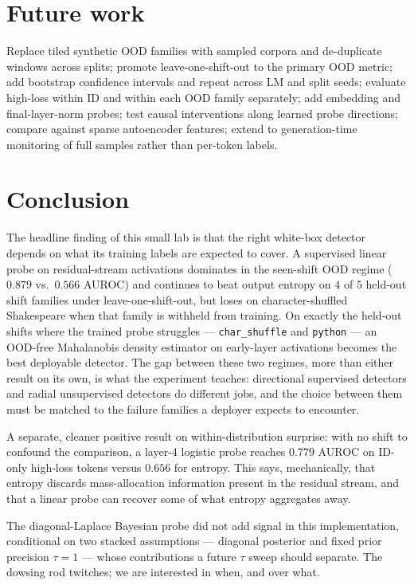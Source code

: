 \documentclass[11pt]{article}
\begin{document}
\section{Future work}

Replace tiled synthetic OOD families with sampled corpora and de-duplicate windows across splits; promote leave-one-shift-out to the primary OOD metric; add bootstrap confidence intervals and repeat across LM and split seeds; evaluate high-loss within ID and within each OOD family separately; add embedding and final-layer-norm probes; test causal interventions along learned probe directions; compare against sparse autoencoder features; extend to generation-time monitoring of full samples rather than per-token labels.

\section{Conclusion}

The headline finding of this small lab is that the right white-box detector depends on what its training labels are expected to cover. A supervised linear probe on residual-stream activations dominates in the seen-shift OOD regime ($0.879$ vs.\ $0.566$ AUROC) and continues to beat output entropy on $4$ of $5$ held-out shift families under leave-one-shift-out, but loses on character-shuffled Shakespeare when that family is withheld from training. On exactly the held-out shifts where the trained probe struggles --- \texttt{char\_shuffle} and \texttt{python} --- an OOD-free Mahalanobis density estimator on early-layer activations becomes the best deployable detector. The gap between these two regimes, more than either result on its own, is what the experiment teaches: directional supervised detectors and radial unsupervised detectors do different jobs, and the choice between them must be matched to the failure families a deployer expects to encounter.

A separate, cleaner positive result on within-distribution surprise: with no shift to confound the comparison, a layer-4 logistic probe reaches $0.779$ AUROC on ID-only high-loss tokens versus $0.656$ for entropy. This says, mechanically, that entropy discards mass-allocation information present in the residual stream, and that a linear probe can recover some of what entropy aggregates away.

The diagonal-Laplace Bayesian probe did not add signal in this implementation, conditional on two stacked assumptions --- diagonal posterior and fixed prior precision $\tau=1$ --- whose contributions a future $\tau$ sweep should separate. The dowsing rod twitches; we are interested in when, and over what.
\end{document}
